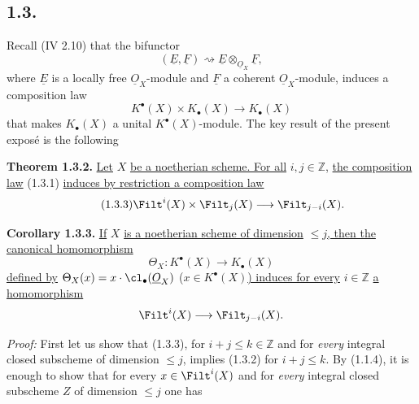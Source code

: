 \subsection*{1.3.}
Recall (IV 2.10) that the bifunctor
\[
(\underline{E},\underline{F})\rightsquigarrow \underline{E}\otimes_{\underline{O}_X}\underline{F},
\]
where $\underline{E}$ is a locally free $\underline{O}_X$-module and $\underline{F}$ a coherent $\underline{O}_X$-module, induces a composition law
\begin{equation}\tag{1.3.1}
K^{\bullet}(X)\times K_\bullet(X)\longrightarrow K_\bullet(X)
\end{equation}
that makes $K_\bullet(X)$ a unital $K^{\bullet}(X)$-module. The key result of the present exposé is the following

\textbf{Theorem 1.3.2.} \uline{Let} $X$ \uline{be a noetherian scheme. For all} $i,j\in\mathbb Z$, \uline{the composition law} (1.3.1) \uline{induces by restriction a composition law}
\begin{equation}\tag{1.3.3}
\Filt^i(X)\times\Filt_j(X)\longrightarrow\Filt_{j-i}(X).
\end{equation}

\textbf{Corollary 1.3.3.} \uline{If} $X$ \uline{is a noetherian scheme of dimension} $\leq j$\uline{, then the canonical homomorphism}
\[
\Theta_X:K^{\bullet}(X)\longrightarrow K_\bullet(X)
\]
\uline{defined by} $\Theta_X(x)=x\cdot\cl_\bullet(\underline{O}_X)$ ($x\in K^{\bullet}(X)$\uline{) induces for every} $i\in\mathbb Z$ \uline{a homomorphism}
\[
\Filt^i(X)\longrightarrow\Filt_{j-i}(X).
\]

\emph{Proof:} First let us show that (1.3.3), for $i+j\leq k\in\mathbb Z$ and for \emph{every} integral closed subscheme of dimension $\leq j$, implies (1.3.2) for $i+j\leq k$. By (1.1.4), it is enough to show that for every $x\in\Filt^i(X)$ and for \emph{every} integral closed subscheme $Z$ of dimension $\leq j$ one has


